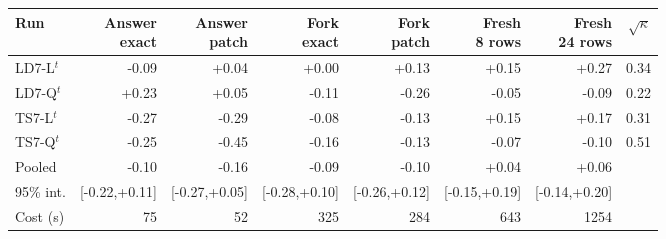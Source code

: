 \begin{tabular}{lrrrrrrr}
\toprule
Run & \makecell{Answer\\exact} & \makecell{Answer\\patch} & \makecell{Fork\\exact} & \makecell{Fork\\patch} & \makecell{Fresh\\8 rows} & \makecell{Fresh\\24 rows} & $\sqrt{\kappa}$ \\
\midrule
LD7-L$^t$ & -0.09 & +0.04 & +0.00 & +0.13 & +0.15 & +0.27 & 0.34 \\
LD7-Q$^t$ & +0.23 & +0.05 & -0.11 & -0.26 & -0.05 & -0.09 & 0.22 \\
TS7-L$^t$ & -0.27 & -0.29 & -0.08 & -0.13 & +0.15 & +0.17 & 0.31 \\
TS7-Q$^t$ & -0.25 & -0.45 & -0.16 & -0.13 & -0.07 & -0.10 & 0.51 \\
\midrule
Pooled & -0.10 & -0.16 & -0.09 & -0.10 & +0.04 & +0.06 & \\
95\% int. & \scriptsize[-0.22,+0.11] & \scriptsize[-0.27,+0.05] & \scriptsize[-0.28,+0.10] & \scriptsize[-0.26,+0.12] & \scriptsize[-0.15,+0.19] & \scriptsize[-0.14,+0.20] & \\
Cost (s) & 75 & 52 & 325 & 284 & 643 & 1254 & \\
\bottomrule
\end{tabular}
